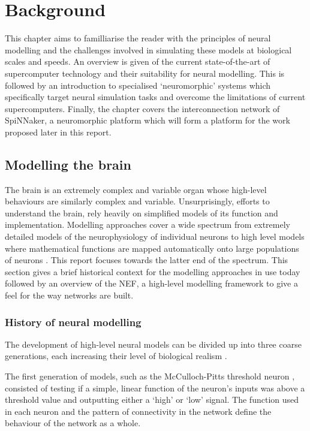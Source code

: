 \chapter{Background}
	
	\label{sec:background}
	
	This chapter aims to familliarise the reader with the principles of neural
	modelling and the challenges involved in simulating these models at biological
	scales and speeds. An overview is given of the current state-of-the-art of
	supercomputer technology and their suitability for neural modelling. This is
	followed by an introduction to specialised `neuromorphic' systems which
	specifically target neural simulation tasks and overcome the limitations of
	current supercomputers. Finally, the chapter covers the interconnection
	network of SpiNNaker, a neuromorphic platform which will form a platform for
	the work proposed later in this report.
	
	\section{Modelling the brain}
		
		
		The brain is an extremely complex and variable organ whose high-level
		behaviours are similarly complex and variable. Unsurprisingly, efforts to
		understand the brain, rely heavily on simplified models of its function and
		implementation. Modelling approaches cover a wide spectrum from extremely
		detailed models of the neurophysiology of individual neurons
		\cite{carnevale06} to high level models where mathematical functions are
		mapped automatically onto large populations of neurons \cite{eliasmith04}.
		This report focuses towards the latter end of the spectrum. This section
		gives a brief historical context for the modelling approaches in use today
		followed by an overview of the NEF, a high-level modelling framework to give
		a feel for the way networks are built.
		
		\subsection{History of neural modelling}
			
			The development of high-level neural models can be divided up into three
			coarse generations, each increasing their level of biological realism
			\cite{vainbrand11}.
			
			The first generation of models, such as the McCulloch-Pitts threshold neuron
			\cite{mcculloch43}, consisted of testing if a simple, linear function of
			the neuron's inputs was above a threshold value and outputting either a
			`high' or `low' signal. The function used in each neuron and the pattern
			of connectivity in the network define the behaviour of the network as a
			whole.
			
